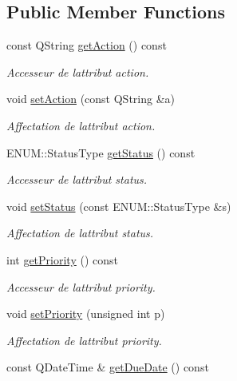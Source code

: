 \subsection*{Public Member Functions}
\begin{DoxyCompactItemize}
\item 
const Q\+String \hyperlink{class_task_a3c99152a4a000b4b3ae8a50b2c450825}{get\+Action} () const
\begin{DoxyCompactList}\small\item\em Accesseur de l\textquotesingle{}attribut action. \end{DoxyCompactList}\item 
void \hyperlink{class_task_ad463acfa4bddcc649113c25ea3fe36b8}{set\+Action} (const Q\+String \&a)
\begin{DoxyCompactList}\small\item\em Affectation de l\textquotesingle{}attribut action. \end{DoxyCompactList}\item 
E\+N\+U\+M\+::\+Status\+Type \hyperlink{class_task_a3eff8551f6ca6e268a2127388a097720}{get\+Status} () const
\begin{DoxyCompactList}\small\item\em Accesseur de l\textquotesingle{}attribut status. \end{DoxyCompactList}\item 
void \hyperlink{class_task_aa76f619ae910047bd304797639eda9d5}{set\+Status} (const E\+N\+U\+M\+::\+Status\+Type \&s)
\begin{DoxyCompactList}\small\item\em Affectation de l\textquotesingle{}attribut status. \end{DoxyCompactList}\item 
int \hyperlink{class_task_a3fbfcf08d8976c01282220f7f4c74c91}{get\+Priority} () const
\begin{DoxyCompactList}\small\item\em Accesseur de l\textquotesingle{}attribut priority. \end{DoxyCompactList}\item 
void \hyperlink{class_task_a593a947b4be458bd94f94bcc91a21e57}{set\+Priority} (unsigned int p)
\begin{DoxyCompactList}\small\item\em Affectation de l\textquotesingle{}attribut priority. \end{DoxyCompactList}\item 
const Q\+Date\+Time \& \hyperlink{class_task_abee7cd65af2bb2028dfaa3ec0d10bfe5}{get\+Due\+Date} () const

\end{DoxyCompactItemize}
